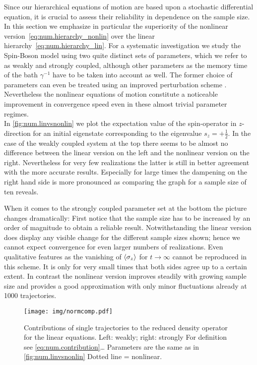 Since our hierarchical equations of motion are based upon a stochastic differential equation, it is crucial to assess their reliability in dependence on the sample size.
In this section we emphasize in particular the superiority of the nonlinear version~\ref{eq:num.hierarchy_nonlin} over the linear hierarchy~\ref{eq:num.hierarchy_lin}.
For a systematic investigation we study the Spin-Boson model using two quite distinct sets of parameters, which we refer to as weakly and strongly coupled, although other parameters as the memory time of the bath $\gamma^{-1}$ have to be taken into account as well.
The former choice of parameters can even be treated using an improved perturbation scheme \cite{GaHuZh10_qubit,HuZh08_qubit}.
Nevertheless the nonlinear equations of motion constitute a noticeable improvement in convergence speed even in these almost trivial parameter regimes.\\

In \autoref{fig:num.linvsnonlin} we plot the expectation value of the spin-operator in $z$-direction for an initial eigenstate corresponding to the eigenvalue $s_z = +\frac{1}{2}$.
In the case of the weakly coupled system at the top there seems to be almost no difference between the linear version on the left and the nonlinear version on the right.
Nevertheless for very few realizations the latter is still in better agreement with the more accurate results.
Especially for large times the dampening on the right hand side is more pronounced as comparing the graph for a sample size of ten reveals.

When it comes to the strongly coupled parameter set at the bottom the picture changes dramatically:
First notice that the sample size has to be increased by an order of magnitude to obtain a reliable result.
Notwithstanding the linear version does display any visible change for the different sample sizes shown; hence we cannot expect convergence for even larger numbers of realizations.
Even qualitative features as the vanishing of $\langle \sigma_z \rangle$ for $t \to \infty$ cannot be reproduced in this scheme.
It is only for very small times that both sides agree up to a certain extent.
In contrast the nonlinear version improves steadily with growing sample size and provides a good approximation with only minor fluctuations already at 1000 trajectories. \\

\begin{figure}[t]
  \centering
  \texttt{[image: img/normcomp.pdf]}
  \caption{%
    Contributions of single trajectories to the reduced density operator for the linear equations.
    Left: weakly; right: strongly
    For definition see \autoref{eq:num.contribution}\dots
    Parameters are the same as in \autoref{fig:num.linvsnonlin}
    Dotted line = nonlinear.
  }
  \label{fig:num.normcomp}
\end{figure}

